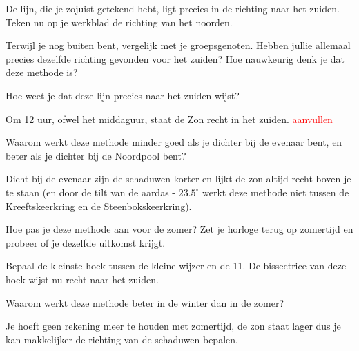 De lijn, die je zojuist getekend hebt, ligt precies in de richting naar het zuiden. Teken nu op je werkblad de richting van het noorden.

\begin{opgave}[\discussie]
    Terwijl je nog buiten bent, vergelijk met je groepsgenoten. Hebben jullie allemaal precies dezelfde richting gevonden voor het zuiden? Hoe nauwkeurig denk je dat deze methode is?
\end{opgave}

\begin{opgave}
    Hoe weet je dat deze lijn precies naar het zuiden wijst?
    \begin{antwoord}
        Om 12 uur, ofwel het middaguur, staat de Zon recht in het zuiden. \textcolor{red}{aanvullen}
    \end{antwoord}
\end{opgave}

\begin{opgave}
    Waarom werkt deze methode minder goed als je dichter bij de evenaar bent, en beter als je dichter bij de Noordpool bent? 
    \begin{antwoord}
        Dicht bij de evenaar zijn de schaduwen korter en lijkt de zon altijd recht boven je te staan (en door de tilt van de aardas - $23.5^{\circ}$ werkt deze methode niet tussen de Kreeftskeerkring en de Steenbokskeerkring).
    \end{antwoord}
\end{opgave}

\begin{opgave}[\schaar]
    Hoe pas je deze methode aan voor de zomer? Zet je horloge terug op zomertijd en probeer of je dezelfde uitkomst krijgt.
    \begin{antwoord}
        Bepaal de kleinste hoek tussen de kleine wijzer en de 11. De bissectrice van deze hoek wijst nu recht naar het zuiden.   
    \end{antwoord}
\end{opgave}

\begin{opgave}
    Waarom werkt deze methode beter in de winter dan in de zomer? 
    \begin{antwoord}
        Je hoeft geen rekening meer te houden met zomertijd, de zon staat lager dus je kan makkelijker de richting van de schaduwen bepalen.
    \end{antwoord}
\end{opgave}

